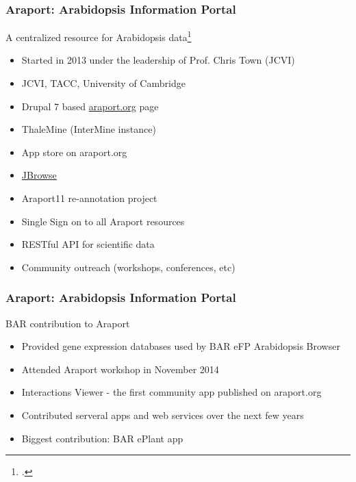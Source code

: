 \documentclass{beamer}
\begin{document}
\begin{frame}
    \frametitle{Araport: Arabidopsis Information Portal}
    A centralized resource for Arabidopsis data\footcite{araport2015}
    \begin{itemize}
        \item Started in 2013 under the leadership of Prof. Chris Town (JCVI)
        \item JCVI, TACC, University of Cambridge
        \item Drupal 7 based \href{http://araport.org}{araport.org} page
        \item ThaleMine (InterMine instance)
        \item App store on araport.org
        \item \href{https://apps.araport.org/jbrowse/?data=arabidopsis}{JBrowse}
        \item Araport11 re-annotation project
        \item Single Sign on to all Araport resources
        \item RESTful API for scientific data
        \item Community outreach (workshops, conferences, etc)
    \end{itemize}
\end{frame}

\begin{frame}
    \frametitle{Araport: Arabidopsis Information Portal}
    BAR contribution to Araport
    \begin{itemize}
        \item Provided gene expression databases used by BAR eFP Arabidopsis Browser
        \item Attended Araport workshop in November 2014
        \item Interactions Viewer - the first community app published on araport.org
        \item Contributed serveral apps and web services over the next few years
        \item Biggest contribution: BAR ePlant app
    \end{itemize}
\end{frame}
\end{document}
